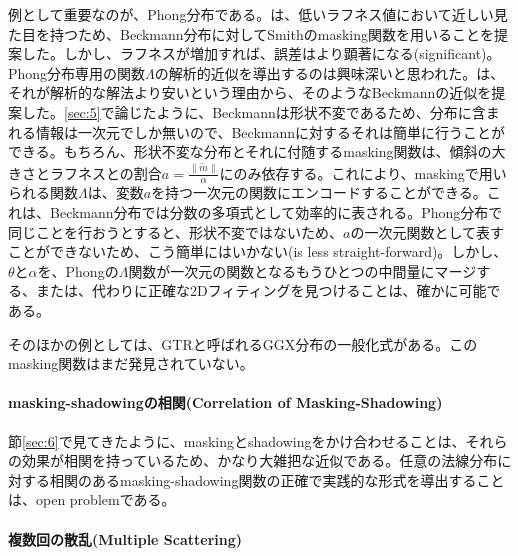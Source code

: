 \documentclass[a4j,xelatex,ja=standard]{bxjsarticle}
\begin{document}
例として重要なのが、Phong分布である\cite{Walter2007}。\citeauthor{Walter2007}は、低いラフネス値において近しい見た目を持つため、Beckmann分布に対してSmithのmasking関数を用いることを提案した。しかし、ラフネスが増加すれば、誤差はより顕著になる(significant)。Phong分布専用の関数$\Lambda$の解析的近似を導出するのは興味深いと思われた。\cite{Walter2007}は、それが解析的な解法より安いという理由から、そのようなBeckmannの近似を提案した。\ref{sec:5}で論じたように、Beckmannは形状不変であるため、分布に含まれる情報は一次元でしか無いので、Beckmannに対するそれは簡単に行うことができる。もちろん、形状不変な分布とそれに付随するmasking関数は、傾斜の大きさとラフネスとの割合$a = \frac{\|\tilde{m}\|}{\alpha}$にのみ依存する。これにより、maskingで用いられる関数$\Lambda$は、変数$a$を持つ一次元の関数にエンコードすることができる。これは、Beckmann分布では分数の多項式として効率的に表される。Phong分布で同じことを行おうとすると、形状不変ではないため、$a$の一次元関数として表すことができないため、こう簡単にはいかない(is less straight-forward)。しかし、$\theta$と$\alpha$を、Phongの$\Lambda$関数が一次元の関数となるもうひとつの中間量にマージする、または、代わりに正確な2Dフィティングを見つけることは、確かに可能である。

そのほかの例としては、GTRと呼ばれるGGX分布の一般化式\cite{Burley2012}がある。このmasking関数はまだ発見されていない。

\paragraph{masking-shadowingの相関(Correlation of Masking-Shadowing)}

節\ref{sec:6}で見てきたように、maskingとshadowingをかけ合わせることは、それらの効果が相関を持っているため、かなり大雑把な近似である。任意の法線分布に対する相関のあるmasking-shadowing関数の正確で実践的な形式を導出することは、open problemである。

\paragraph{複数回の散乱(Multiple Scattering)}
\end{document}
